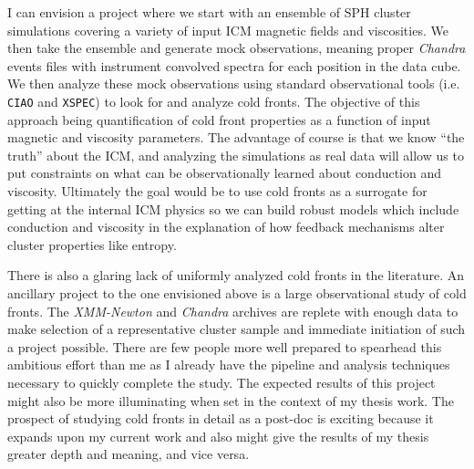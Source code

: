 \documentclass[11pt]{article}
\begin{document}
I can envision a project where we start with an ensemble of SPH
cluster simulations covering a variety of input ICM magnetic fields and
viscosities. We then take the ensemble and generate mock observations,
meaning proper {\it Chandra} events files with instrument convolved
spectra for each position in the data cube. We then analyze these mock
observations using standard observational tools (i.e. {\tt CIAO} and
{\tt XSPEC}) to look for and analyze cold fronts. The objective of
this approach being quantification of cold front properties as a
function of input magnetic and viscosity parameters. The advantage
of course is that we know ``the truth'' about the ICM, and analyzing
the simulations as real data will allow us to put constraints on what
can be observationally learned about conduction and
viscosity. Ultimately the goal would be to use cold fronts as a
surrogate for getting at the internal ICM physics so we can build
robust models which include conduction and viscosity in the
explanation of how feedback mechanisms alter cluster properties like
entropy.

There is also a glaring lack of uniformly analyzed cold fronts in
the literature. An ancillary project to the one envisioned 
above is a large observational study of cold fronts. The {\it
XMM-Newton} and {\it Chandra} archives are replete with enough data to
make selection of a representative cluster sample and immediate
initiation of such a project possible. There are few people more well
prepared to spearhead this ambitious effort than me as I already have the
pipeline and analysis techniques necessary to quickly complete the
study. The expected results of this project might also be more
illuminating when set in the context of my thesis work. The prospect
of studying cold fronts in detail as a post-doc is exciting because it
expands upon my current work and also might give the results of my
thesis greater depth and meaning, and vice versa.
\end{document}
